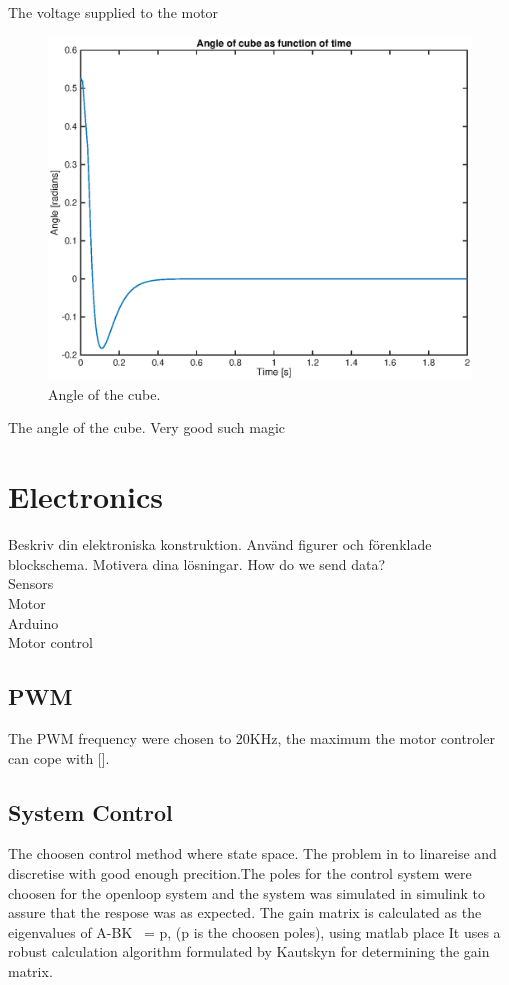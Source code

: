 \documentclass[a4paper,11pt]{kth-mag}
\begin{document}
The voltage supplied to the motor

\begin{figure}[!htb]
\centering
\includegraphics[scale=.7]{angleplot.eps}
\caption{Angle of the cube.}
\label{fig:voltageplot}
\end{figure}

The angle of the cube. Very good such magic


\section{Electronics}
Beskriv din elektroniska konstruktion. Använd figurer och förenklade blockschema. Motivera dina lösningar.
How do we send data?
\\ Sensors
\\ Motor
\\ Arduino
\\ Motor control

\subsection{PWM}
The PWM frequency were chosen to 20KHz, the maximum the motor controler can cope with [].
 

\subsection{System Control}
The choosen control method where state space. The problem in to linareise and discretise with good enough precition.The poles for the control system were choosen for the openloop system and the system was simulated in 
	simulink to assure that the respose was as expected. 
	The gain matrix is calculated as the eigenvalues of A-BK ~= p, (p is the choosen poles), using matlab place
	It uses a robust calculation algorithm formulated by Kautskyn for determining the gain matrix.
\end{document}
